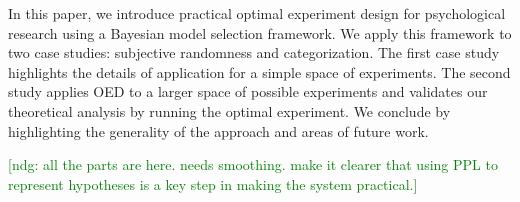 \documentclass{article}
\newcommand{\ndg}[1]{\textcolor{Green}{[ndg: #1]}}
\begin{document}
In this paper, we introduce practical optimal experiment design for psychological research using a Bayesian model selection framework.
We apply this framework to two case studies: subjective randomness and categorization.
The first case study highlights the details of application for a simple space of experiments.
The second study applies OED to a larger space of possible experiments and validates our theoretical analysis by running the optimal experiment.
We conclude by highlighting the generality of the approach and areas of future work.


\ndg{all the parts are here. needs smoothing. make it clearer that using PPL to represent hypotheses is a key step in making the system practical.}

\end{document}
